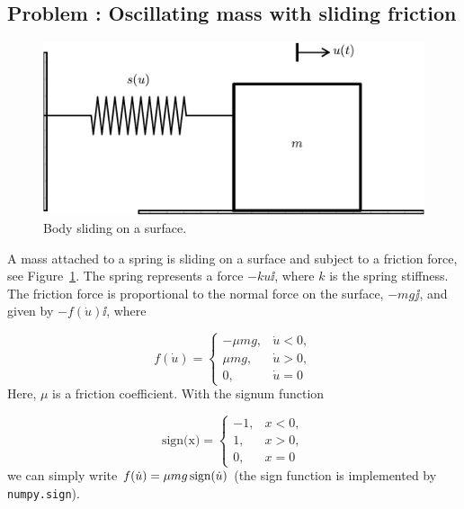 \documentclass[graybox,envcountchap,sectrefs,final]{svmonodo}
\newcounter{doconce:movie:counter}
\newenvironment{doconceexercise}{}{}
\newcounter{doconceexercisecounter}
\begin{document}




\begin{doconceexercise}

\subsection*{Problem \thedoconceexercisecounter: Oscillating mass with sliding friction}

\label{scale:vib:exer:sliding}


\begin{figure}[!ht]  %
  \centerline{\includegraphics[width=0.7\linewidth]{fig-scaling/oscillator_sliding.pdf}}
  \caption{
  Body sliding on a surface. \label{scale:vib:exer:sliding:fig}
  }
\end{figure}


A mass attached to a spring is sliding on a surface and subject to
a friction force, see Figure~\ref{scale:vib:exer:sliding:fig}.
The spring represents a force $-ku\ii$, where $k$ is the spring stiffness.
The friction force is proportional to the normal force on the surface,
$-mg\jj$, and given by $-f(\dot u)\ii$, where

\[ f(\dot u) = \left\lbrace\begin{array}{ll}
-\mu mg,& \dot u < 0,\\ 
\mu mg, & \dot u > 0,\\ 
0,      & \dot u=0
\end{array}\right.\]
Here, $\mu$ is a friction coefficient. With the signum function

\[ \mbox{sign(x)} = \left\lbrace\begin{array}{ll}
-1,& x < 0,\\ 
1, & x > 0,\\ 
0, & x=0
\end{array}\right.\]
we can simply write $f(\dot u) = \mu mg\,\hbox{sign}(\dot u)$
(the sign function is implemented by \texttt{numpy.sign}).


\end{doconceexercise}
\end{document}
